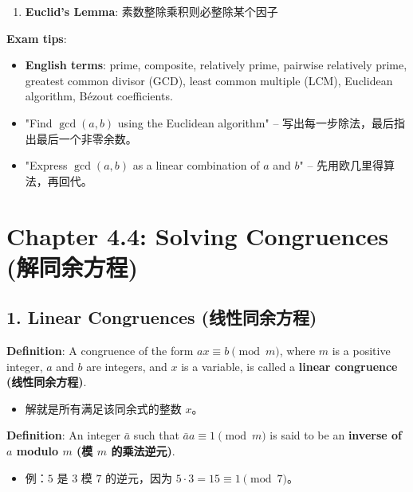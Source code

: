 \documentclass[10pt,a4paper,openany]{ctexbook}
\theoremstyle{definition}
\theoremstyle{remark}
\begin{document}
\begin{enumerate}
\item \textbf{Euclid's Lemma}: 素数整除乘积则必整除某个因子

\end{enumerate}

\textbf{Exam tips}:
\begin{itemize}
\item \textbf{English terms}: prime, composite, relatively prime, pairwise relatively prime, greatest common divisor (GCD), least common multiple (LCM), Euclidean algorithm, B\'ezout coefficients.
\item "Find $\gcd(a,b)$ using the Euclidean algorithm" -- 写出每一步除法，最后指出最后一个非零余数。
\item "Express $\gcd(a,b)$ as a linear combination of $a$ and $b$" -- 先用欧几里得算法，再回代。

\end{itemize}


\section{Chapter 4.4: Solving Congruences (解同余方程)}

\vspace{-2pt}

\subsection{1. Linear Congruences (线性同余方程)}

\textbf{Definition}: A congruence of the form $ax \equiv b \pmod{m}$, where $m$ is a positive integer, $a$ and $b$ are integers, and $x$ is a variable, is called a \textbf{linear congruence (线性同余方程)}.
\begin{itemize}
\item 解就是所有满足该同余式的整数 $x$。

\end{itemize}

\textbf{Definition}: An integer $\bar{a}$ such that $\bar{a}a \equiv 1 \pmod{m}$ is said to be an \textbf{inverse of $a$ modulo $m$ (模 $m$ 的乘法逆元)}.
\begin{itemize}
\item 例：$5$ 是 $3$ 模 $7$ 的逆元，因为 $5 \cdot 3 = 15 \equiv 1 \pmod{7}$。

\end{itemize}
\end{document}

